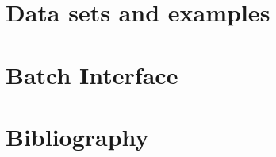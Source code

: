 \documentclass[a4paper,titlepage]{book}
\begin{document}



%


\part{Data sets and examples}




%



%



\part{Batch Interface}




\part{Bibliography}


\end{document}
